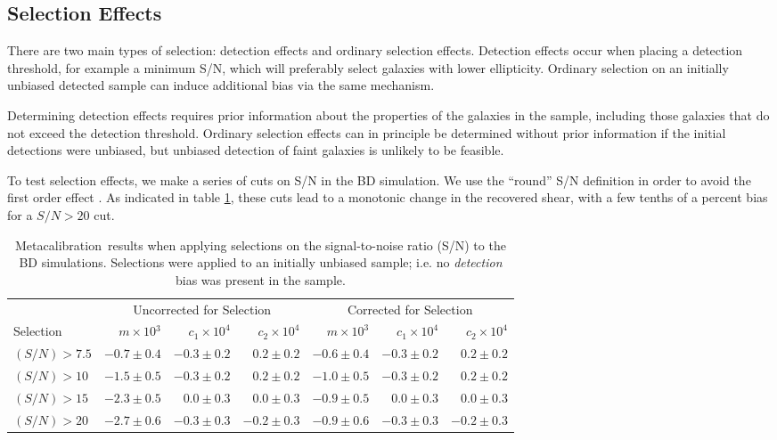 \documentclass[usegraphicx,usenatbib]{mn2e}
\newcommand{\Mcal}{Metacalibration}
\begin{document}
\subsection{Selection Effects} \label{sec:selection}

There are two main types of selection: detection effects and ordinary selection
effects.  Detection effects occur when placing a detection threshold, for
example a minimum S/N, which will preferably select galaxies with lower
ellipticity.  Ordinary selection on an initially unbiased detected sample can
induce additional bias via the same mechanism.

Determining detection effects requires prior information about the properties of
the galaxies in the sample, including those galaxies that do not exceed the detection
threshold.  Ordinary selection effects can in principle be determined without
prior information if the initial detections were unbiased, but unbiased
detection of faint galaxies is unlikely to be feasible.

To test selection effects, we make a series of cuts on S/N in the BD
simulation.  We use the ``round'' S/N definition in order to avoid the first
order effect \citep{DESSVShear}. As indicated in table \ref{tab:selresults},
these cuts lead to a monotonic change in the recovered shear, with a few
tenths of a percent bias for a $S/N > 20$ cut.

\begin{table}
    \centering
    \caption{\Mcal\ results when applying selections on the signal-to-noise ratio (S/N) to the BD simulations. Selections
    were applied to an initially unbiased sample; i.e. no {\em detection}
    bias was present in the sample. \label{tab:selresults}}
    \begin{tabular}{ |l| r|r|r|  r|r|r|}
        \hline
        & \multicolumn{3}{c}{Uncorrected for Selection} & \multicolumn{3}{c}{Corrected for Selection} \\
        Selection & $m \times 10{^3} $ & $c_1 \times 10^4$ & $c_2 \times 10^4$ & $m \times 10^{3}$ & $c_1 \times 10^4$ & $c_2 \times 10^4$ \\
        \hline
        $(S/N) > 7.5$  & $-0.7 \pm 0.4$ & $-0.3 \pm 0.2$ & $0.2 \pm 0.2$ & $-0.6 \pm 0.4$ & $-0.3 \pm 0.2$ & $0.2 \pm 0.2$  \\
        $(S/N) > 10$   & $-1.5 \pm 0.5$ & $-0.3 \pm 0.2$ & $0.2 \pm 0.2$ & $-1.0 \pm 0.5$ & $-0.3 \pm 0.2$ & $0.2 \pm 0.2$  \\
        $(S/N) > 15$   & $-2.3 \pm 0.5$ & $0.0 \pm 0.3$ & $0.0 \pm 0.3$ & $-0.9 \pm 0.5$ & $0.0 \pm 0.3$ & $0.0 \pm 0.3$  \\
        $(S/N) > 20$   & $-2.7 \pm 0.6$ & $-0.3 \pm 0.3$ & $-0.2\pm 0.3$ & $-0.9 \pm 0.6$ & $-0.3 \pm 0.3$ & $-0.2 \pm 0.3$  \\
    \end{tabular}
\end{table}
\end{document}
